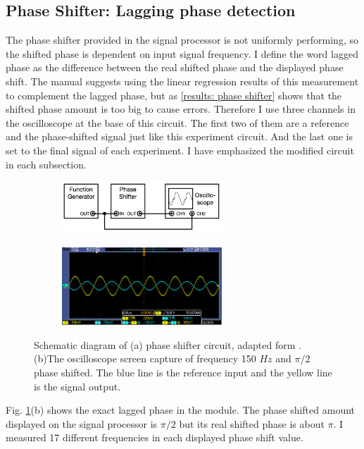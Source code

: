 \documentclass{article}
\begin{document}
\subsection{Phase Shifter: Lagging phase detection}
The phase shifter provided in the signal processor is not uniformly performing, so the shifted phase is dependent on input signal frequency.
I define the word lagged phase as the difference between the real shifted phase and the displayed phase shift.
The manual suggests using the linear regression results of this measurement to complement the lagged phase, but as \ref{results: phase shifter} shows that the shifted phase amount is too big to cause errors.
Therefore I use three channels in the oscilloscope at the base of this circuit.
The first two of them are a reference and the phase-shifted signal just like this experiment circuit.
And the last one is set to the final signal of each experiment.
I have emphasized the modified circuit in each subsection.
\begin{figure}[ht]
    \centering
    \begin{subfigure}[b]{6cm}
        \centering
        \includegraphics[width=6cm]{../results/phase_shifter_circuit.png}
        \caption{}
    \end{subfigure}
    \hfill
    \begin{subfigure}[b]{6cm}
        \centering
        \includegraphics[width=6cm]{../raw_data/TEK00306.PNG}
        \caption{}
    \end{subfigure}
    \hfill
    \caption{Schematic diagram of (a) phase shifter circuit, adapted form  \cite{signal_processor}.
    (b)The oscilloscope screen capture of frequency 150 $Hz$ and $\pi/2$ phase shifted.
    The blue line is the reference input and the yellow line is the signal output.}
    \label{fig: phase_shifter_circuit}
  \end{figure}

 Fig. \ref{fig: phase_shifter_circuit}(b) shows the exact lagged phase in the module.
 The phase shifted amount displayed on the signal processor is $\pi/2$ but its real shifted phase is about $\pi$.
 I measured 17 different frequencies in each displayed phase shift value.
\end{document}
